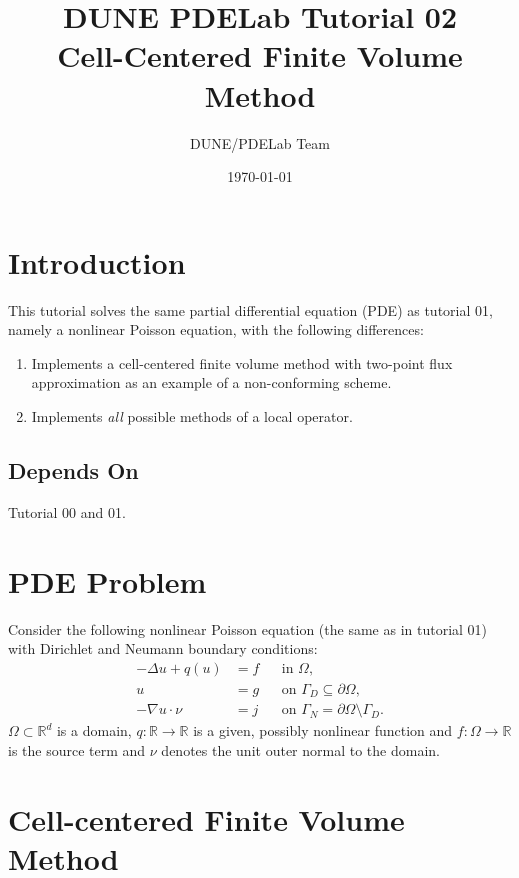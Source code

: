 \documentclass[a4paper,12pt]{article}
\title{DUNE PDELab Tutorial 02 \\ Cell-Centered Finite Volume Method}
\author{DUNE/PDELab Team}
\date{\today}
\begin{document}
\maketitle
\tableofcontents
\clearpage

\section{Introduction}

This tutorial solves the same partial differential equation (PDE) as tutorial 01, namely
a nonlinear Poisson equation, with the following differences:
\begin{enumerate}[1)]
\item Implements a cell-centered finite volume method with two-point flux
approximation as an example of a non-conforming scheme.
\item Implements \textit{all} possible methods of a local operator.
\end{enumerate}

\subsection*{Depends On} Tutorial 00 and 01.

\section{PDE Problem}

Consider the following nonlinear Poisson equation (the same as in tutorial 01) with
Dirichlet and Neumann boundary conditions:
\begin{subequations} \label{eq:ProblemStrong}
\begin{align}
-\Delta u + q(u) &= f &&\text{in $\Omega$},\\
u &= g &&\text{on $\Gamma_D\subseteq\partial\Omega$},\\
-\nabla u\cdot \nu &= j &&\text{on $\Gamma_N=\partial\Omega\setminus\Gamma_D$}.
\end{align}
\end{subequations}
$\Omega\subset\mathbb{R}^d$ is a domain, $q:\mathbb{R}\to\mathbb{R}$ is a given, possibly
nonlinear function and $f: \Omega\to\mathbb{R}$ is the source term and
$\nu$ denotes the unit outer normal to the domain.

\section{Cell-centered Finite Volume Method}
\label{sec:fv_method}
\end{document}
